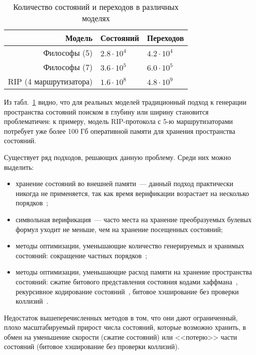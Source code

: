 \documentclass[a4paper,notitlepage,14pt]{article}
\begin{document}
\begin{table}
  \centering
  \begin{tabular}{|r|l|l|}
    \hline
    Модель                  & Состояний         & Переходов       \\
    \hline
    Философы (5)            & $2.8 \cdot 10^4$  & $4.2 \cdot 10^4$ \\
    Философы (7)            & $3.6 \cdot 10^5$  & $6.0 \cdot 10^5$ \\
    RIP (4 маршрутизатора)  & $1.6 \cdot 10^8$  & $4.8 \cdot 10^9$ \\
    \hline
  \end{tabular}
  \caption{Количество состояний и переходов в различных моделях}
\label{tab:models-statecount}
\end{table}

Из табл.~\ref{tab:models-statecount} видно, что для реальных моделей традиционный подход к
генерации пространства состояний поиском в глубину или ширину становится проблематичен: к
примеру, модель RIP-протокола с 5-ю маршрутизаторами потребует уже более 100 Гб
оперативной памяти для хранения пространства состояний.

Существует ряд подходов, решающих данную проблему. Среди них можно выделить:

\begin{itemize}
\item хранение состояний во внешней памяти~--- данный подход практически никогда не
  применяется, так как время верификации возрастает на несколько порядков~\cite{Clarke};
\item символьная верификация~--- часто места на хранение преобразуемых булевых формул
  уходит не меньше, чем на хранение посещенных состояний;
\item методы оптимизации, уменьшающие количество генерируемых и хранимых состояний:
  сокращение частных порядков~\cite{POD};
\item методы оптимизации, уменьшающие расход памяти на хранение пространства состояний:
  сжатие битового представления состояния кодами хаффмана~\cite{StateCompr}, рекурсивное
  кодирование состояний~\cite{StateCompr}, битовое хэширование без проверки
  коллизий~\cite{BitHash1,Wolper}.
\end{itemize}

Недостаток вышеперечисленных методов в том, что они дают ограниченный, плохо
масштабируемый прирост числа состояний, которые возможно хранить, в обмен на уменьшение
скорости (сжатие состояний) или <<потерю>> части состояний (битовое хэширование без
проверки коллизий).
\end{document}
